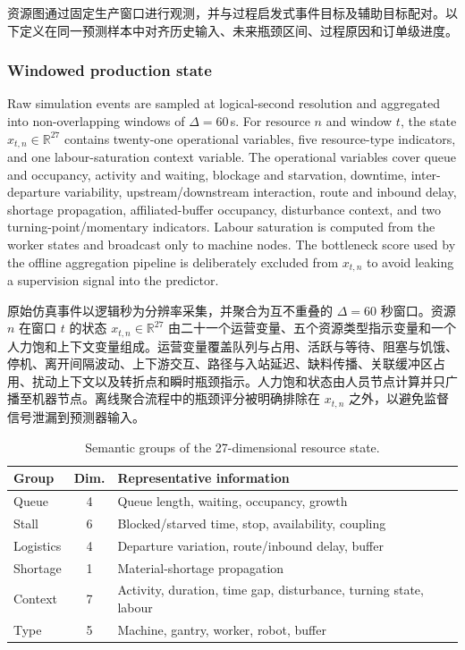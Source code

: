 \documentclass[a4paper,fleqn]{cas-dc}
\newcommand{\zhpara}[1]{%
  \par\begingroup\small\color{black!72}\noindent #1\par\endgroup}
\begin{document}
\zhpara{资源图通过固定生产窗口进行观测，并与过程启发式事件目标及辅助目标配对。以下定义在同一预测样本中对齐历史输入、未来瓶颈区间、过程原因和订单级进度。}

\subsubsection{Windowed production state}

Raw simulation events are sampled at logical-second resolution and aggregated into non-overlapping windows of $\Delta=60$\,s. For resource $n$ and window $t$, the state $x_{t,n}\in\mathbb{R}^{27}$ contains twenty-one operational variables, five resource-type indicators, and one labour-saturation context variable. The operational variables cover queue and occupancy, activity and waiting, blockage and starvation, downtime, inter-departure variability, upstream/downstream interaction, route and inbound delay, shortage propagation, affiliated-buffer occupancy, disturbance context, and two turning-point/momentary indicators. Labour saturation is computed from the worker states and broadcast only to machine nodes. The bottleneck score used by the offline aggregation pipeline is deliberately excluded from $x_{t,n}$ to avoid leaking a supervision signal into the predictor.

\zhpara{原始仿真事件以逻辑秒为分辨率采集，并聚合为互不重叠的 $\Delta=60$ 秒窗口。资源 $n$ 在窗口 $t$ 的状态 $x_{t,n}\in\mathbb{R}^{27}$ 由二十一个运营变量、五个资源类型指示变量和一个人力饱和上下文变量组成。运营变量覆盖队列与占用、活跃与等待、阻塞与饥饿、停机、离开间隔波动、上下游交互、路径与入站延迟、缺料传播、关联缓冲区占用、扰动上下文以及转折点和瞬时瓶颈指示。人力饱和状态由人员节点计算并只广播至机器节点。离线聚合流程中的瓶颈评分被明确排除在 $x_{t,n}$ 之外，以避免监督信号泄漏到预测器输入。}

\begin{table}[t]
\centering
\caption{Semantic groups of the 27-dimensional resource state.}
\label{tab:feature-groups}
\scriptsize
\setlength{\tabcolsep}{3pt}
\renewcommand{\arraystretch}{1.12}
\begin{tabularx}{\columnwidth}{@{}l c >{\raggedright\arraybackslash}X@{}}
\toprule
Group & Dim. & Representative information \\
\midrule
Queue & 4 & Queue length, waiting, occupancy, growth \\
Stall & 6 & Blocked/starved time, stop, availability, coupling \\
Logistics & 4 & Departure variation, route/inbound delay, buffer \\
Shortage & 1 & Material-shortage propagation \\
Context & 7 & Activity, duration, time gap, disturbance, turning state, labour \\
Type & 5 & Machine, gantry, worker, robot, buffer \\
\bottomrule
\end{tabularx}
\end{table}
\end{document}
